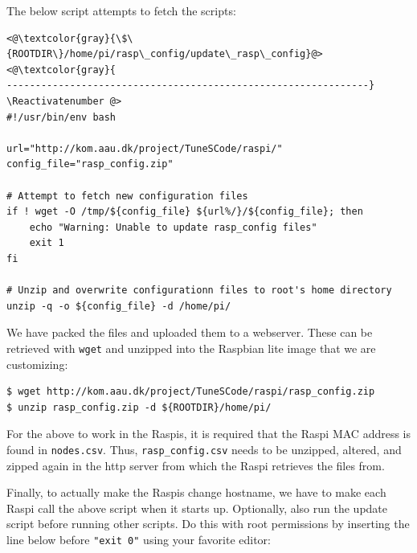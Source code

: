 The below script attempts to fetch the scripts:

\Suppressnumber\begin{lstlisting}[]
<@\textcolor{gray}{\$\{ROOTDIR\}/home/pi/rasp\_config/update\_rasp\_config}@>
<@\textcolor{gray}{
---------------------------------------------------------------}
\Reactivatenumber @>
#!/usr/bin/env bash

url="http://kom.aau.dk/project/TuneSCode/raspi/"
config_file="rasp_config.zip"

# Attempt to fetch new configuration files
if ! wget -O /tmp/${config_file} ${url%/}/${config_file}; then
    echo "Warning: Unable to update rasp_config files"
    exit 1
fi

# Unzip and overwrite configurationn files to root's home directory
unzip -q -o ${config_file} -d /home/pi/
\end{lstlisting}
\FloatBarrier
\vspace{-5mm}


We have packed the files and uploaded them to a webserver. These can be
retrieved with \texttt{wget} and unzipped into the Raspbian lite image that
we are customizing:

\begin{lstlisting}[]
$ wget http://kom.aau.dk/project/TuneSCode/raspi/rasp_config.zip
$ unzip rasp_config.zip -d ${ROOTDIR}/home/pi/
\end{lstlisting}
\FloatBarrier
\vspace{-5mm}

For the above to work in the \ac{Raspi}s, it is required that the \ac{Raspi}
\ac{MAC} address is found in \texttt{nodes.csv}. Thus,
\texttt{rasp\_config.csv} needs to be unzipped, altered, and zipped again in
the http server from which the \ac{Raspi} retrieves the files from.


Finally, to actually make the \ac{Raspi}s change hostname, we have to make
each \ac{Raspi} call the above script when it starts up. Optionally,
also run the update script before running other scripts.
Do this with root permissions by inserting the line below before
\texttt{"exit 0"} using your favorite editor:

